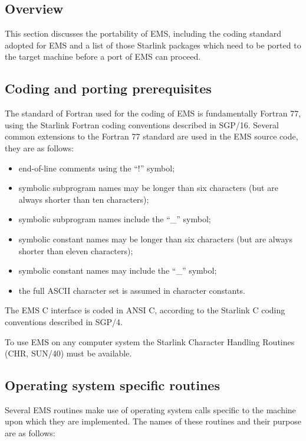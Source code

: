 \subsection {Overview}

This section discusses the portability of EMS, including the coding 
standard adopted for EMS and a list of those Starlink packages which 
need to be ported to the target machine before a port of EMS can proceed.

\subsection {Coding and porting prerequisites}

The standard of Fortran used for the coding of EMS is fundamentally Fortran 77,
using the Starlink Fortran coding conventions described in SGP/16.
Several common extensions to the Fortran 77 standard are used in the EMS source 
code, they are as follows:

\begin {itemize}
\item end-of-line comments using the ``!'' symbol;
\item symbolic subprogram names may be longer than six characters (but are 
always shorter than ten characters);
\item symbolic subprogram names include the ``\_'' symbol;
\item symbolic constant names may be longer than six characters (but are always
shorter than eleven characters);
\item symbolic constant names may include the ``\_'' symbol;
\item the full ASCII character set is assumed in character constants.
\end {itemize}

The EMS C interface is coded in ANSI C, according to the Starlink C coding
conventions described in SGP/4. 

To use EMS on any computer system the Starlink Character Handling
Routines (CHR, SUN/40) must be available.


\subsection {Operating system specific routines}

Several EMS routines make use of operating system calls specific to the 
machine upon which they are implemented.
The names of these routines and their purpose are as follows:

